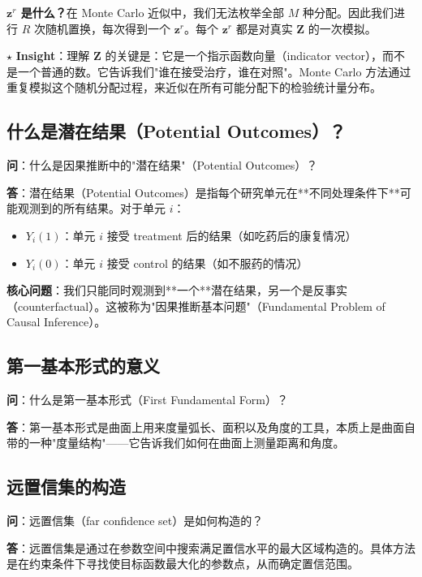 \textbf{$\mathbf{z}^r$ 是什么？}在 Monte Carlo 近似中，我们无法枚举全部 $M$ 种分配。因此我们进行 $R$ 次随机置换，每次得到一个 $\mathbf{z}^r$。每个 $\mathbf{z}^r$ 都是对真实 $\mathbf{Z}$ 的一次模拟。

$\star$ \textbf{Insight}：理解 $\mathbf{Z}$ 的关键是：它是一个指示函数向量（indicator vector），而不是一个普通的数。它告诉我们"谁在接受治疗，谁在对照"。Monte Carlo 方法通过重复模拟这个随机分配过程，来近似在所有可能分配下的检验统计量分布。

\subsection{什么是潜在结果（Potential Outcomes）？}\label{sec:qa-potential-outcomes-general}

\textbf{问}：什么是因果推断中的"潜在结果"（Potential Outcomes）？

\textbf{答}：潜在结果（Potential Outcomes）是指每个研究单元在**不同处理条件下**可能观测到的所有结果。对于单元 $i$：
\begin{itemize}
  \item $Y_i(1)$：单元 $i$ 接受 treatment 后的结果（如吃药后的康复情况）
  \item $Y_i(0)$：单元 $i$ 接受 control 的结果（如不服药的情况）
\end{itemize}

\textbf{核心问题}：我们只能同时观测到**一个**潜在结果，另一个是反事实（counterfactual）。这被称为"因果推断基本问题"（Fundamental Problem of Causal Inference）。

\subsection{第一基本形式的意义}\label{sec:qa-first-fundamental-form}

\textbf{问}：什么是第一基本形式（First Fundamental Form）？

\textbf{答}：第一基本形式是曲面上用来度量弧长、面积以及角度的工具，本质上是曲面自带的一种"度量结构"——它告诉我们如何在曲面上测量距离和角度。

\subsection{远置信集的构造}\label{sec:qa-far-confidence-set}

\textbf{问}：远置信集（far confidence set）是如何构造的？

\textbf{答}：远置信集是通过在参数空间中搜索满足置信水平的最大区域构造的。具体方法是在约束条件下寻找使目标函数最大化的参数点，从而确定置信范围。

